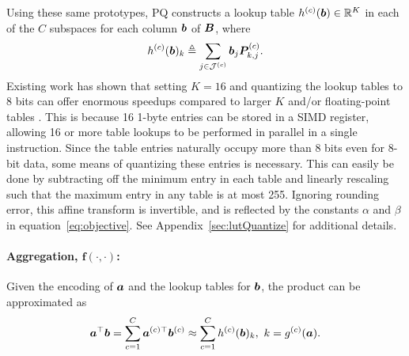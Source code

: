 Using these same prototypes, PQ constructs a lookup table $h^{(c)}(\bm{b}) \in \mathbb{R}^K$ in each of the $C$ subspaces for each column $\bm{b}$ of $\bm{B}$, where
\begin{align}
    h^{(c)}(\bm{b})_k \triangleq \sum_{j\in \mathcal{J}^{(c)}} \bm{b}_j \bm{P}^{(c)}_{k,j}.
\end{align}
Existing work has shown that setting $K = 16$ and quantizing the lookup tables to 8 bits can offer enormous speedups compared to larger $K$ and/or floating-point tables \cite{bolt, quickAdc, quickerAdc}. This is because 16 1-byte entries can be stored in a SIMD register, allowing 16 or more table lookups to be performed in parallel in a single instruction. Since the table entries naturally occupy more than 8 bits even for 8-bit data, some means of quantizing these entries is necessary. This can easily be done by subtracting off the minimum entry in each table and linearly rescaling such that the maximum entry in any table is at most 255. Ignoring rounding error, this affine transform is invertible, and is reflected by the constants $\alpha$ and $\beta$ in equation~\ref{eq:objective}. See Appendix~\ref{sec:lutQuantize} for additional details.


\vspace{-2mm}
\paragraph{Aggregation, $\bm{f(\cdot,\cdot)}$:}

Given the encoding of $\bm{a}$ and the lookup tables for $\bm{b}$, the product can be approximated as
\vspace*{-2mm}
\begin{align}
    \bm{a}^\top \bm{b} = \sum_{c=1}^C \bm{a}^{(c)\top} \bm{b}^{(c)} \approx \sum_{c=1}^C h^{(c)}(\bm{b})_k, \text{ }k = g^{(c)}(\bm{a}).
\end{align}


